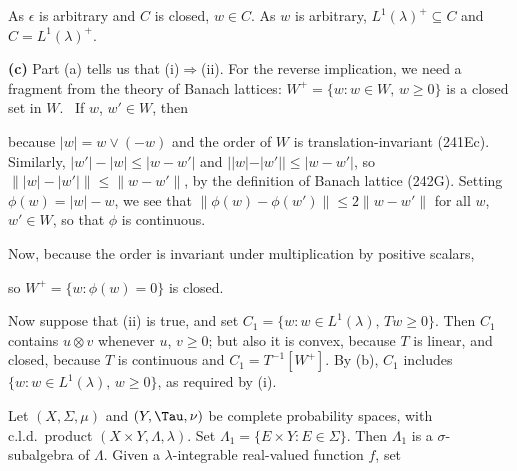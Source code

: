 {\noindent As $\epsilon$ is arbitrary and $C$ is closed, $w\in C$.   As
$w$ is arbitrary, $L^1(\lambda)^+\subseteq C$ and $C=L^1(\lambda)^+$.

\medskip

{\bf (c)} Part (a) tells us that (i)$\Rightarrow$(ii).   For the reverse
implication, we need a fragment from the theory of Banach lattices:
$W^+=\{w:w\in W,\,w\ge 0\}$ is a closed set in $W$.
\Prf\ If $w$, $w'\in W$, then




\noindent because $|w|=w\vee(-w)$ and the order of $W$ is
translation-invariant (241Ec).   Similarly, $|w'|-|w|\le|w-w'|$ and
$||w|-|w'||\le|w-w'|$, so $\||w|-|w'|\|\le\|w-w'\|$, by the definition
of Banach lattice (242G).   Setting $\phi(w)=|w|-w$, we see that
$\|\phi(w)-\phi(w')\|\le 2\|w-w'\|$ for all $w$, $w'\in W$, so that
$\phi$ is continuous.

Now, because the order is invariant under multiplication by positive
scalars,


\noindent so $W^+=\{w:\phi(w)=0\}$ is closed.\ \Qed

Now suppose that (ii) is true, and set
$C_1=\{w:w\in L^1(\lambda),\,Tw\ge 0\}$.   Then $C_1$ contains
$u\otimes v$ whenever $u$, $v\ge 0$;  but also
it is convex, because $T$ is linear, and closed, because $T$ is
continuous and $C_1=T^{-1}[W^+]$.   By (b), $C_1$ includes
$\{w:w\in L^1(\lambda),\,w\ge 0\}$, as required by (i).
}%

 Let $(X,\Sigma,\mu)$ and $(Y,\Tau,\nu)$ be
complete probability spaces, with c.l.d.\ product
$(X\times Y,\Lambda,\lambda)$.   Set $\Lambda_1=\{E\times Y:E\in\Sigma\}$.
Then $\Lambda_1$ is a $\sigma$-subalgebra of $\Lambda$.   Given a
$\lambda$-integrable real-valued function $f$, set


